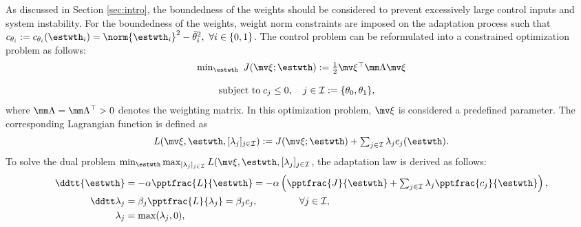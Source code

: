 \documentclass[letterpaper, 10 pt, conference]{ieeeconf}  %
\begin{document}
As discussed in Section \ref{sec:intro}, the boundedness of the weights should be considered to prevent excessively large control inputs and system instability.
For the boundedness of the weights, weight norm constraints are imposed on the adaptation process such that $c_{\theta_i}:=c_{\theta_i}(\estwth_i)=\norm{{\estwth}_i}^2-\bar\theta^2_i,\ \forall i\in\{0,1\}$.
The control problem can be reformulated into a constrained optimization problem as follows:
\begin{equation}
    \begin{matrix}
        \min_{{\estwth}} \ J(\mv \xi;{\estwth})
        :=
        \tfrac{1}{2}
        \mv \xi^\top \mm \Lambda \mv \xi
        \\ \\
        \begin{aligned}
        \text{subject to\;}&c_{j}\le0, \quad j\in\mathcal I 
        := 
        \{\theta_0,\theta_1\}
        ,
        \end{aligned}
    \end{matrix}
\end{equation}
where $\mm \Lambda=\mm \Lambda^\top >0$ denotes the weighting matrix.
In this optimization problem, $\mv \xi$ is considered a predefined parameter.
The corresponding Lagrangian function is defined as
\begin{equation}
    L(
        \mv \xi,
        {\estwth},
        [\lambda_j]_{j\in\mathcal I}
    )
    := 
    J(\mv \xi;{\estwth})
    +
    \textstyle\sum_{j\in\mathcal I} \lambda_jc_j({\estwth})
    .
\end{equation}
To solve the dual problem $\min_{{\estwth}} \max_{[\lambda_j]_{j\in\mathcal I}}  L(\mv \xi,{\estwth},[\lambda_j]_{j\in\mathcal I}$, the adaptation law is derived as follows:
\begin{subequations}
    \begin{align}
            \ddtt {{\estwth}}
            &
            =
            -\alpha 
            \pptfrac{L}{{\estwth}}
            =-\alpha 
            \left(
                \pptfrac{J}{{\estwth}}
                +
                \textstyle\sum_{j\in\mathcal{I}}
                \lambda_j 
                \pptfrac{c_j}{\estwth}
            \right),
        \label{eq. adaptation law th}
            \\
            \ddtt\lambda_j
            & 
            = 
            \beta_j
            \pptfrac{L}{\lambda_j} 
            = 
            \beta_j c_j ,
            \quad\quad\quad\quad      \      
            \forall j\in\mathcal I,
        \label{eq. adaptation law L}
            \\
            \lambda_j 
            & 
            = 
            \max(\lambda_j,0) ,
        \label{eq. adaptation law L max}
    \end{align}
    \label{eq. adaptation laws}
\end{subequations}
\end{document}

